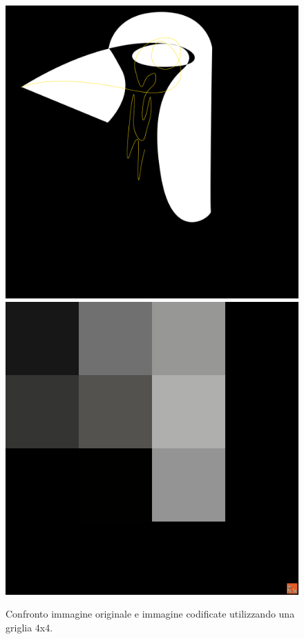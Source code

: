 \begin{figure}[htb] \centering
\includegraphics[scale=0.03]{Pictures/in ricordo del pinguino cameriere.png}
\qquad\qquad
\includegraphics[scale=0.03]{Pictures/canvas8x8.png}
\caption{Confronto immagine originale e immagine codificate utilizzando una griglia 4x4.}\label{fig:figura}
\end{figure}

